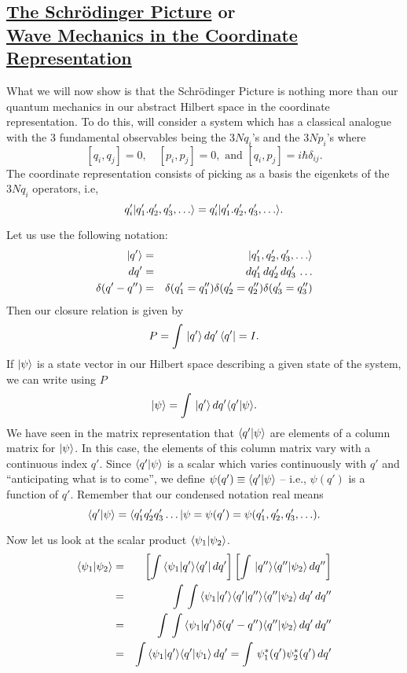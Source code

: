 \subsection{\underline{The Schr\"odinger Picture} or \\ \underline{Wave Mechanics in the Coordinate Representation}}

What we will now show is that the Schr\"odinger Picture is nothing more than our quantum mechanics in our abstract Hilbert space in the coordinate representation. 
To do this, will consider a system which has a classical analogue with the 3 fundamental observables being the $3N q_i$'s and the $3N p_i$'s where 
$$[q_i, q_j] = 0, \quad [p_i, p_j] = 0, \mbox{     and } [q_i, p_j] = i\hbar \delta_{ij}.$$
The coordinate representation consists of picking as a basis the eigenkets of the $3N q_i$ operators, i.e,
$$q_i'|q'_1. q'_2, q'_3, \hdots\rangle = q'_i |q'_1. q'_2, q'_3, \hdots\rangle.$$

Let us use the following notation:
\begin{eqnarray*}
|q'\rangle &=& |q'_1, q'_2, q'_3, \hdots\rangle\\
dq'      &=& dq'_1\,dq'_2\,dq'_3\,\hdots\\
\delta(q'-q'') &=& \delta(q'_1 = q''_1) \delta(q'_2 = q''_2)\delta(q'_3 = q''_3)
\end{eqnarray*}
Then our closure relation is given by
$$P = \int\, |q'\rangle\, dq'\, \langle q'| = I.$$
If $|\psi\rangle$ is a state vector in our Hilbert space describing a given state of the system, we can write using $P$
$$|\psi\rangle = \int\, |q'\rangle \, dq' \langle q'|\psi\rangle.$$
We have seen in the matrix representation that $\langle q'|\psi\rangle$ are elements of a column matrix for $|\psi\rangle$. In this case, the elements of this column matrix 
vary with a continuous index $q'$. Since $\langle q'|\psi\rangle$ is a scalar which varies continuously with $q'$ and ``anticipating what is to come'', we define $\psi(q') \equiv \langle q'|\psi\rangle$ -- 
i.e., $\psi(q')$ is a function of $q'$. Remember that our condensed notation real means
$$\langle q'|\psi\rangle = \langle q'_1 q'_2 q'_3\hdots|{\psi} = \psi(q') = \psi(q'_1, q'_2, q'_3, \hdots).$$

Now let us look at the scalar product $\langle \psi_1|\psi_2\rangle$.
\begin{eqnarray*}
\langle \psi_1|\psi_2\rangle &=& \left[ \int\, \langle \psi_1|q'\rangle \langle q'|\, dq'  \right]  \left[  \int\,  |q''\rangle\langle q''|\psi_2\rangle \, dq''   \right] \\
                                    &=& \int\, \int\, \langle \psi_1|q'\rangle \langle q'|q''\rangle \langle q''|\psi_2\rangle \,dq'\, dq'' \\
                                    &=& \int\, \int\, \langle \psi_1|q'\rangle \delta(q' -q'') \langle q''|\psi_2\rangle \,dq'\, dq''\\
                                    &=& \int\, \langle \psi_1|q'\rangle\langle q'|\psi_1\rangle \,dq' = \int\, \psi^*_1(q') \psi^*_2(q') \,dq'
\end{eqnarray*}

